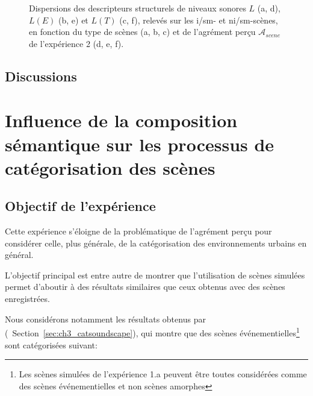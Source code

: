 \begin{figure}[t]
        \caption{Dispersions des descripteurs structurels de niveaux sonores $L$ (a, d), $L(E)$ (b, e) et $L(T)$ (c, f), relevés sur les i/sm- et ni/sm-scènes, en fonction du type de scènes (a, b, c) et de l'agrément perçu $\mathcal{A}_{scene}$ de l'expérience 2 (d, e, f).}\label{fig:soundlevelSansMarker}
\end{figure}

\subsection{Discussions}



\section[Composition sémantique et catégorisation]{Influence de la composition sémantique sur les processus de catégorisation des scènes}
\label{sec:xp4}

\subsection{Objectif de l'expérience}
\label{sec:ch5_objXp3}

Cette  expérience s'éloigne de la problématique de l'agrément perçu pour considérer celle, plus générale, de la catégorisation des environnements urbains en général. 

L'objectif principal est entre autre de montrer que l’utilisation de scènes simulées permet d'aboutir à des résultats similaires que ceux obtenus avec des scènes enregistrées.

Nous considérons notamment les résultats obtenus par \citep{maffiolo_caracterisation_1999} (\cf~Section~\ref{sec:ch3_catsoundscape}), qui montre que des scènes événementielles\footnote{Les scènes simulées de l'expérience 1.a peuvent être toutes considérées comme des scènes événementielles et non scènes amorphes} sont catégorisées suivant:

